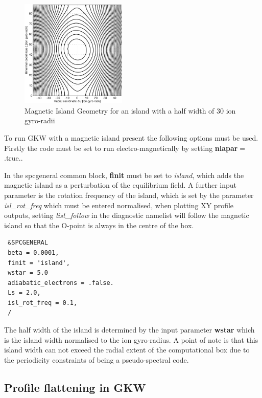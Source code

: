 \documentclass{report}
\begin{document}
\begin{figure}
\begin{center}
\includegraphics[width=0.45\textwidth]{MagIslGeom.eps}
\caption{Magnetic Island Geometry for an island with a half width of 30 ion gyro-radii}
\label{islandgeom}
\end{center}
\end{figure}

To run GKW with a magnetic island present the following options must be used.  Firstly the code must be set to run electro-magnetically by setting {\bf nlapar}$=$.true..

In the spcgeneral common block, {\bf finit} must be set to {\it island}, which adds the magnetic island as a perturbation of the equilibrium field.  A further input parameter is the rotation frequency of the island, which is set by the parameter {\it isl\_rot\_freq} which must be entered normalised, when plotting XY profile outputs, setting {\it list\_follow} in the diagnostic namelist will follow the magnetic island so that the O-point is always in the centre of the box.

\begin{verbatim}
 &SPCGENERAL
 beta = 0.0001,
 finit = 'island',
 wstar = 5.0
 adiabatic_electrons = .false.
 Ls = 2.0,
 isl_rot_freq = 0.1,
 /
\end{verbatim}

The half width of the island is determined by the input parameter {\bf wstar} which is the island width normalised to the ion gyro-radius.  A point of note is that this island width can not exceed the radial extent of the computational box due to the periodicity constraints of being a pseudo-spectral code.

\subsection{Profile flattening in GKW}
\end{document}
